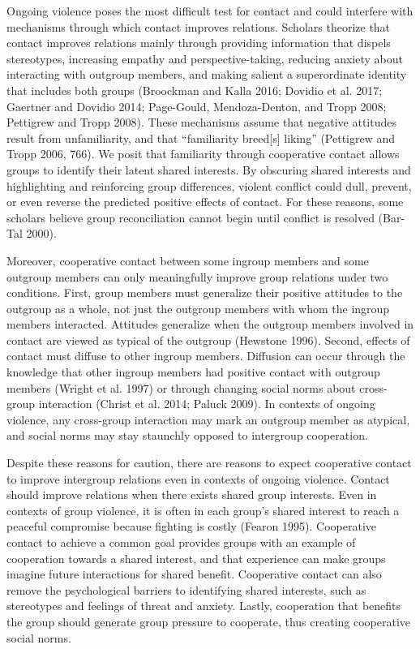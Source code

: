 \documentclass[11pt]{article}
\begin{document}
Ongoing violence poses the most difficult test for contact and could
interfere with mechanisms through which contact improves relations.
Scholars theorize that contact improves relations mainly through
providing information that dispels stereotypes, increasing empathy and
perspective-taking, reducing anxiety about interacting with outgroup
members, and making salient a superordinate identity that includes both
groups (Broockman and Kalla 2016; Dovidio et al. 2017; Gaertner and
Dovidio 2014; Page-Gould, Mendoza-Denton, and Tropp 2008; Pettigrew and
Tropp 2008). These mechanisms assume that negative attitudes result from
unfamiliarity, and that ``familiarity breed{[}s{]} liking'' (Pettigrew
and Tropp 2006, 766). We posit that familiarity through cooperative
contact allows groups to identify their latent shared interests. By
obscuring shared interests and highlighting and reinforcing group
differences, violent conflict could dull, prevent, or even reverse the
predicted positive effects of contact. For these reasons, some scholars
believe group reconciliation cannot begin until conflict is resolved
(Bar-Tal 2000).

Moreover, cooperative contact between some ingroup members and some
outgroup members can only meaningfully improve group relations under two
conditions. First, group members must generalize their positive
attitudes to the outgroup as a whole, not just the outgroup members with
whom the ingroup members interacted. Attitudes generalize when the
outgroup members involved in contact are viewed as typical of the
outgroup (Hewstone 1996). Second, effects of contact must diffuse to
other ingroup members. Diffusion can occur through the knowledge that
other ingroup members had positive contact with outgroup members (Wright
et al. 1997) or through changing social norms about cross-group
interaction (Christ et al. 2014; Paluck 2009). In contexts of ongoing
violence, any cross-group interaction may mark an outgroup member as
atypical, and social norms may stay staunchly opposed to intergroup
cooperation.

Despite these reasons for caution, there are reasons to expect
cooperative contact to improve intergroup relations even in contexts of
ongoing violence. Contact should improve relations when there exists
shared group interests. Even in contexts of group violence, it is often
in each group's shared interest to reach a peaceful compromise because
fighting is costly (Fearon 1995). Cooperative contact to achieve a
common goal provides groups with an example of cooperation towards a
shared interest, and that experience can make groups imagine future
interactions for shared benefit. Cooperative contact can also remove the
psychological barriers to identifying shared interests, such as
stereotypes and feelings of threat and anxiety. Lastly, cooperation that
benefits the group should generate group pressure to cooperate, thus
creating cooperative social norms.
\end{document}
